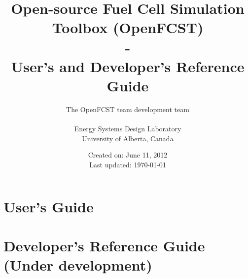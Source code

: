 \documentclass[]{book}
\title{{\Huge Open-source Fuel Cell Simulation Toolbox (OpenFCST)} \\
       { - \\}
       {\huge User's and Developer's Reference Guide}}
\author{The OpenFCST team development team \\
                 \\
        Energy Systems Design Laboratory\\
        University of Alberta, Canada}
\date{Created on: June 11, 2012 \\
      Last updated: \today}
\begin{document}
\maketitle

\tableofcontents



\part{User's Guide}





% 


\part{Developer's Reference Guide (Under development)}



%
%


%
\end{document}
